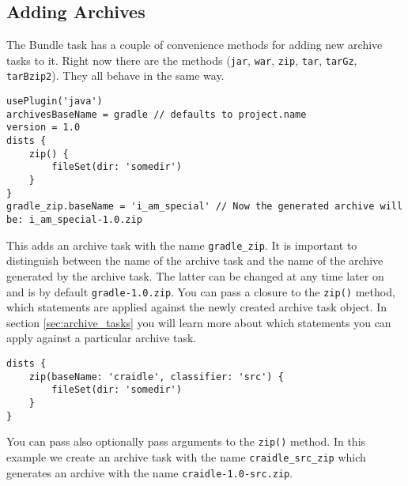 \subsection{Adding Archives} %
\label{sub:adding_archives}
The Bundle task has a couple of convenience methods for adding new archive tasks to it. Right now there are the methods (\texttt{jar}, \texttt{war}, \texttt{zip}, \texttt{tar}, \texttt{tarGz}, \texttt{tarBzip2}). They all behave in the same way.
\begin{Verbatim}
usePlugin('java')
archivesBaseName = gradle // defaults to project.name
version = 1.0
dists {
    zip() {
        fileSet(dir: 'somedir')
    }
}	
gradle_zip.baseName = 'i_am_special' // Now the generated archive will be: i_am_special-1.0.zip
\end{Verbatim}
This adds an archive task with the name \texttt{gradle\_zip}. It is important to distinguish between the name of the archive task and the name of the archive generated by the archive task. The latter can be changed at any time later on and is by default \texttt{gradle-1.0.zip}. You can pass a closure to the \texttt{zip()} method, which statements are applied against the newly created archive task object. In section \ref{sec:archive_tasks} you will learn more about which statements you can apply against a particular archive task.
\begin{Verbatim}
dists {
    zip(baseName: 'craidle', classifier: 'src') {
        fileSet(dir: 'somedir')
    }
}
\end{Verbatim}
You can pass also optionally pass arguments to the \texttt{zip()} method. In this example we create an archive task with the name \texttt{craidle\_src\_zip} which generates an archive with the name \texttt{craidle-1.0-src.zip}. 

